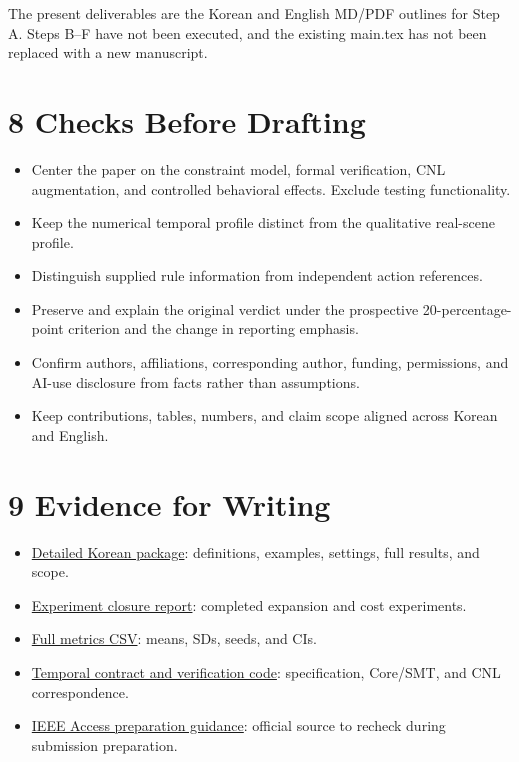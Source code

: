 \documentclass[11pt,a4paper]{article}
\begin{document}
The present deliverables are the Korean and English MD/PDF outlines for Step A. Steps B–F have not been executed, and the existing main.tex has not been replaced with a new manuscript.\par

\section*{8 Checks Before Drafting}

\begin{itemize}
\item Center the paper on the constraint model, formal verification, CNL augmentation, and controlled behavioral effects. Exclude testing functionality.
\item Keep the numerical temporal profile distinct from the qualitative real-scene profile.
\item Distinguish supplied rule information from independent action references.
\item Preserve and explain the original verdict under the prospective 20-percentage-point criterion and the change in reporting emphasis.
\item Confirm authors, affiliations, corresponding author, funding, permissions, and AI-use disclosure from facts rather than assumptions.
\item Keep contributions, tables, numbers, and claim scope aligned across Korean and English.
\end{itemize}

\section*{9 Evidence for Writing}

\begin{itemize}
\item \href{\detokenize{../../../../../../projects/04-guardsynth-coc/paper/GUARDSYNTH_COC_METHODS_SETTINGS_PACKAGE_V01_KO.md}}{Detailed Korean package}: definitions, examples, settings, full results, and scope.
\item \href{\detokenize{../temporal-experiment-closure-2026-09-29-001/REPORT_KO.md}}{Experiment closure report}: completed expansion and cost experiments.
\item \href{\detokenize{../temporal-experiment-closure-2026-09-29-001/all_primary_metrics.csv}}{Full metrics CSV}: means, SDs, seeds, and CIs.
\item \href{\detokenize{../../../../../../projects/04-guardsynth-coc/experiments/paper1_cnl_learning/temporal_preservation.py}}{Temporal contract and verification code}: specification, Core/SMT, and CNL correspondence.
\item \href{\detokenize{https://ieeeaccess.ieee.org/authors/preparing-your-article/}}{IEEE Access preparation guidance}: official source to recheck during submission preparation.
\end{itemize}
\end{document}
